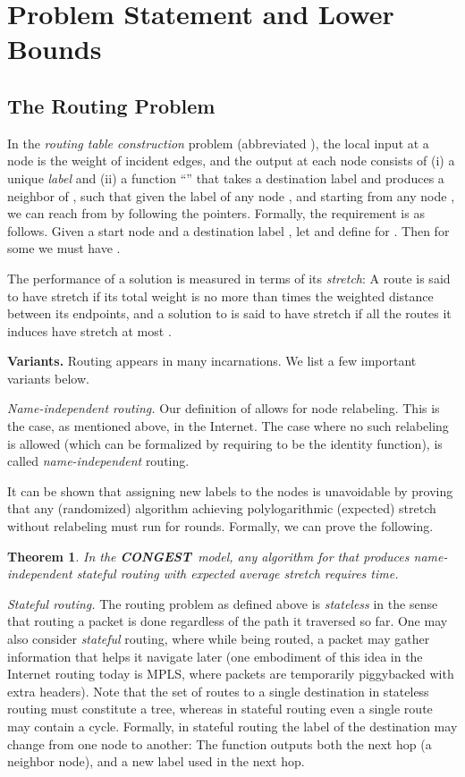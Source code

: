 \documentclass[letterpaper,11pt]{article}
\newtheorem{theorem}{Theorem}[section]
\newcommand{\CONGEST}{\textbf{CONGEST}}
\begin{document}
\section{Problem Statement and Lower Bounds}
\label{sec:prel}
\subsection{The Routing Problem}
\label{sec:problem}
In the \emph{routing table construction} problem (abbreviated ), the local
input at a node is the weight of incident edges, and the output at each node 
consists of (i) a unique \emph{label}  and (ii) a function
``'' that takes a destination label  and produces a neighbor
of , such that given the label  of any node , and starting
from any node , we can reach  from  by following the  pointers.
Formally, the requirement is as follows. Given a start node  and a
destination label , let  and define
 for . Then for some  we must have
.

The performance of a solution is measured in terms of its \emph{stretch}: A
route is said to have stretch  if its total weight is no more than
 times the weighted distance between its endpoints, and a solution to
 is said to have stretch  if all the routes it induces have stretch
at most .

\noindent\textbf{Variants.} Routing appears in many incarnations. We list a few
important variants below.

\emph{Name-independent routing.} Our definition of 
allows for node relabeling. This is the case, as
mentioned above, in the Internet. The case where no such relabeling is allowed
(which can be formalized by requiring  to be the
identity function), is called \emph{name-independent} routing.

It can be shown that assigning new labels to the nodes is
unavoidable by proving that any (randomized) algorithm achieving polylogarithmic
(expected) stretch without relabeling must run for  rounds.
Formally, we can prove the following.
\begin{theorem}
In the \CONGEST\ model, any algorithm for  that produces
name-independent stateful routing with expected average stretch 
 requires  time.
\end{theorem}

\emph{Stateful routing.} The routing problem as defined above is
\emph{stateless} in the sense that routing a packet is done regardless of the
path it traversed so far.  One may also consider \emph{stateful} routing, where
while being routed, a packet may gather information that helps it navigate later
(one embodiment of this idea in the Internet routing today is MPLS, where
packets are temporarily piggybacked with extra headers). Note that the set of
routes to a single destination in stateless routing must constitute a tree,
whereas in stateful routing even a single route may contain a cycle. Formally,
in stateful routing the label of the destination may change from one node to
another: The  function outputs both the next hop (a neighbor node), and
a new label  used in the next hop.
\end{document}
